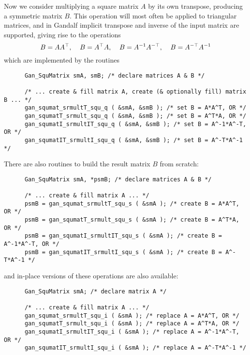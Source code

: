 Now we consider multiplying a square matrix $A$ by its own transpose, producing
a symmetric matrix $B$. This operation will most often be applied to triangular
matrices, and in Gandalf implicit transpose and inverse of the input
matrix are supported, giving rise to the operations
\[ B = A A^{\top},\;\;\;\;B = A^{\top} A,\;\;\;\;B = A^{-1} A^{-\top},\;\;\;\;B = A^{-\top} A^{-1}
\]
which are implemented by the routines
\begin{verbatim}
      Gan_SquMatrix smA, smB; /* declare matrices A & B */

      /* ... create & fill matrix A, create (& optionally fill) matrix B ... */
      gan_squmat_srmultT_squ_q ( &smA, &smB ); /* set B = A*A^T, OR */
      gan_squmatT_srmult_squ_q ( &smA, &smB ); /* set B = A^T*A, OR */
      gan_squmatI_srmultIT_squ_q ( &smA, &smB ); /* set B = A^-1*A^-T, OR */
      gan_squmatIT_srmultI_squ_q ( &smA, &smB ); /* set B = A^-T*A^-1 */
\end{verbatim}
There are also routines to build the result matrix $B$ from scratch:
\begin{verbatim}
      Gan_SquMatrix smA, *psmB; /* declare matrices A & B */

      /* ... create & fill matrix A ... */
      psmB = gan_squmat_srmultT_squ_s ( &smA ); /* create B = A*A^T, OR */
      psmB = gan_squmatT_srmult_squ_s ( &smA ); /* create B = A^T*A, OR */
      psmB = gan_squmatI_srmultIT_squ_s ( &smA ); /* create B = A^-1*A^-T, OR */
      psmB = gan_squmatIT_srmultI_squ_s ( &smA ); /* create B = A^-T*A^-1 */
\end{verbatim}
and in-place versions of these operations are also available:
\begin{verbatim}
      Gan_SquMatrix smA; /* declare matrix A */

      /* ... create & fill matrix A ... */
      gan_squmat_srmultT_squ_i ( &smA ); /* replace A = A*A^T, OR */
      gan_squmatT_srmult_squ_i ( &smA ); /* replace A = A^T*A, OR */
      gan_squmatI_srmultIT_squ_i ( &smA ); /* replace A = A^-1*A^-T, OR */
      gan_squmatIT_srmultI_squ_i ( &smA ); /* replace A = A^-T*A^-1 */
\end{verbatim}

